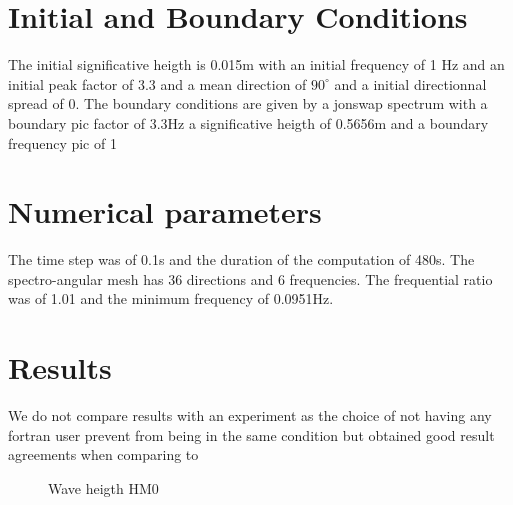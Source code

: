 %
%
\section{Initial and Boundary Conditions}
%
    The initial  significative heigth is 0.015m with an initial frequency of 1 Hz and an initial peak factor of 3.3 and a mean direction of $90^{\circ}$ and a initial directionnal spread of 0.
The boundary conditions are given by a jonswap spectrum with a boundary pic factor of 3.3Hz a significative heigth of 0.5656m and a boundary frequency pic of 1

%
%
\section{Numerical parameters}
%
The time step was of 0.1s and the duration of the computation of 480s. The spectro-angular mesh has 36 directions and 6 frequencies. The frequential ratio was of 1.01 and the minimum frequency of 0.0951Hz.

\section{Results}
We do not compare results with an experiment as the choice of not having any fortran user prevent from being in the same condition but \cite{Bacchi2014} obtained good result agreements when comparing to \cite{Mendez2004}
\begin{figure} [!h]
\centering
{}
 \caption{Wave heigth HM0}
\label{resVeget}
\end{figure}
